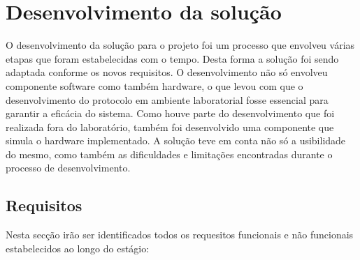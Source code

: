 \section{Desenvolvimento da solução}

O desenvolvimento da solução para o projeto foi um processo que envolveu várias etapas que foram estabelecidas
com o tempo. Desta forma a solução foi sendo adaptada conforme os novos requisitos.
O desenvolvimento não só envolveu componente software como também hardware, o que levou com que o desenvolvimento do
protocolo em ambiente laboratorial fosse essencial para garantir a eficácia do sistema. Como houve parte do desenvolvimento
que foi realizada fora do laboratório, também foi desenvolvido uma componente que simula o hardware implementado.
A solução teve em conta não só a usibilidade do mesmo, como também as dificuldades e limitações encontradas durante o processo de 
desenvolvimento.


\subsection{Requisitos}

Nesta secção irão ser identificados todos os requesitos funcionais e não funcionais estabelecidos ao longo do estágio:

